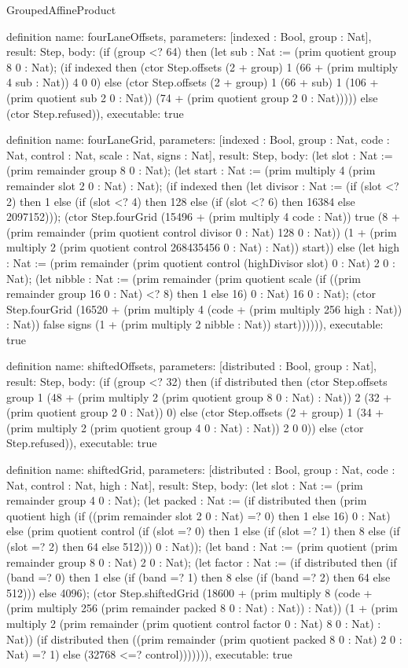 \begin{lexlean}{GroupedAffineProduct}
\begin{semanticmodule}
definition{
  name: fourLaneOffsets,
  parameters: [indexed : Bool, group : Nat],
  result: Step,
  body: (if (group <? 64) then (let sub : Nat := (prim quotient group 8 0 : Nat); (if indexed then (ctor Step.offsets (2 + group) 1 (66 + (prim multiply 4 sub : Nat)) 4 0 0) else (ctor Step.offsets (2 + group) 1 (66 + sub) 1 (106 + (prim quotient sub 2 0 : Nat)) (74 + (prim quotient group 2 0 : Nat))))) else (ctor Step.refused)),
  executable: true
}

definition{
  name: fourLaneGrid,
  parameters: [indexed : Bool, group : Nat, code : Nat, control : Nat, scale : Nat, signs : Nat],
  result: Step,
  body: (let slot : Nat := (prim remainder group 8 0 : Nat); (let start : Nat := (prim multiply 4 (prim remainder slot 2 0 : Nat) : Nat); (if indexed then (let divisor : Nat := (if (slot <? 2) then 1 else (if (slot <? 4) then 128 else (if (slot <? 6) then 16384 else 2097152))); (ctor Step.fourGrid (15496 + (prim multiply 4 code : Nat)) true (8 + (prim remainder (prim quotient control divisor 0 : Nat) 128 0 : Nat)) (1 + (prim multiply 2 (prim quotient control 268435456 0 : Nat) : Nat)) start)) else (let high : Nat := (prim remainder (prim quotient control (highDivisor slot) 0 : Nat) 2 0 : Nat); (let nibble : Nat := (prim remainder (prim quotient scale (if ((prim remainder group 16 0 : Nat) <? 8) then 1 else 16) 0 : Nat) 16 0 : Nat); (ctor Step.fourGrid (16520 + (prim multiply 4 (code + (prim multiply 256 high : Nat)) : Nat)) false signs (1 + (prim multiply 2 nibble : Nat)) start)))))),
  executable: true
}

definition{
  name: shiftedOffsets,
  parameters: [distributed : Bool, group : Nat],
  result: Step,
  body: (if (group <? 32) then (if distributed then (ctor Step.offsets group 1 (48 + (prim multiply 2 (prim quotient group 8 0 : Nat) : Nat)) 2 (32 + (prim quotient group 2 0 : Nat)) 0) else (ctor Step.offsets (2 + group) 1 (34 + (prim multiply 2 (prim quotient group 4 0 : Nat) : Nat)) 2 0 0)) else (ctor Step.refused)),
  executable: true
}

definition{
  name: shiftedGrid,
  parameters: [distributed : Bool, group : Nat, code : Nat, control : Nat, high : Nat],
  result: Step,
  body: (let slot : Nat := (prim remainder group 4 0 : Nat); (let packed : Nat := (if distributed then (prim quotient high (if ((prim remainder slot 2 0 : Nat) =? 0) then 1 else 16) 0 : Nat) else (prim quotient control (if (slot =? 0) then 1 else (if (slot =? 1) then 8 else (if (slot =? 2) then 64 else 512))) 0 : Nat)); (let band : Nat := (prim quotient (prim remainder group 8 0 : Nat) 2 0 : Nat); (let factor : Nat := (if distributed then (if (band =? 0) then 1 else (if (band =? 1) then 8 else (if (band =? 2) then 64 else 512))) else 4096); (ctor Step.shiftedGrid (18600 + (prim multiply 8 (code + (prim multiply 256 (prim remainder packed 8 0 : Nat) : Nat)) : Nat)) (1 + (prim multiply 2 (prim remainder (prim quotient control factor 0 : Nat) 8 0 : Nat) : Nat)) (if distributed then ((prim remainder (prim quotient packed 8 0 : Nat) 2 0 : Nat) =? 1) else (32768 <=? control))))))),
  executable: true
}


\end{semanticmodule}
\end{lexlean}
